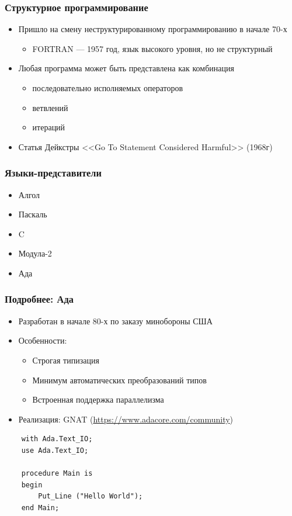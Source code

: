 \documentclass[xetex,mathserif,serif]{beamer}
\begin{document}
    \begin{frame}
        \frametitle{Структурное программирование}
        \begin{itemize}
            \item Пришло на смену неструктурированному программированию в начале 70-х
            \begin{itemize}
                \item FORTRAN --- 1957 год, язык высокого уровня, но не структурный
            \end{itemize}
            \item Любая программа может быть представлена как комбинация
            \begin{itemize}
                \item последовательно исполняемых операторов
                \item ветвлений
                \item итераций
            \end{itemize}
            \item Статья Дейкстры <<Go To Statement Considered Harmful>> (1968г)
        \end{itemize}
    \end{frame}

    \begin{frame}
        \frametitle{Языки-представители}
        \begin{itemize}
            \item Алгол
            \item Паскаль
            \item C
            \item Модула-2
            \item Ада
        \end{itemize}
    \end{frame}

    \begin{frame}[fragile]
        \frametitle{Подробнее: Ада}
        \begin{itemize}
            \item Разработан в начале 80-х по заказу минобороны США
            \item Особенности:
            \begin{itemize}
                \item Строгая типизация
                \item Минимум автоматических преобразований типов
                \item Встроенная поддержка параллелизма
            \end{itemize}
            \item Реализация: GNAT (\url{https://www.adacore.com/community})
        \end{itemize}
        \begin{verbatim}
    with Ada.Text_IO;
    use Ada.Text_IO;

    procedure Main is
    begin
        Put_Line ("Hello World");
    end Main;
        \end{verbatim}
    \end{frame}
\end{document}
